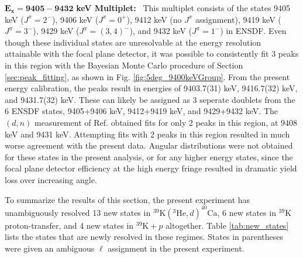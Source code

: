\emph{$\mathbf{E_{x} = 9405-9432}$} \textbf{keV Multiplet:} \, 
This multiplet consists of the states 9405 keV ($J^{\pi} = 2^{-}$), 9406 keV ($J^{\pi} = 0^{+}$), 9412 keV (no $J^{\pi}$ assignment), 9419 keV ($J^{\pi} = 3^{-}$), 9429 keV ($J^{\pi} = (3,4)^{-}$), and 9432 keV ($J^{\pi} = 1^{-}$) in ENSDF. Even though these individual states are unresolvable at the energy resolution attainable with the focal plane detector, it was possible to consistently fit 3 peaks in this region with the Bayesian Monte Carlo procedure of Section \ref{sec:peak_fitting}, as shown in Fig. \ref{fig:5deg_9400keVGroup}. From the present energy calibration, the peaks result in energies of 9403.7(31) keV, 9416.7(32) keV, and 9431.7(32) keV. These can likely be assigned as 3 seperate doublets from the 6 ENSDF states, 9405+9406 keV, 9412+9419 keV, and 9429+9432 keV. The $(d,n)$ measurement of Ref. \cite{Fuchs1969} obtained fits for only 2 peaks in this region, at 9408 keV and 9431 keV. Attempting fits with 2 peaks in this region resulted in much worse agreement with the present data. Angular distributions were not obtained for these states in the present analysis, or for any higher energy states, since the focal plane detector efficiency at the high energy fringe resulted in dramatic yield loss over increasing angle.

To summarize the results of this section, the present experiment has unambiguously resolved 13 new states in $^{39}\mathrm{K}(^{3}\mathrm{He},d)^{40}\mathrm{Ca}$, 6 new states in $^{39}$K proton-transfer, and 4 new states in $^{39}\mathrm{K}+p$ altogether. Table \ref{tab:new_states} lists the states that are newly resolved in these regimes. States in parentheses were given an ambiguous $\ell$ assignment in the present experiment.


